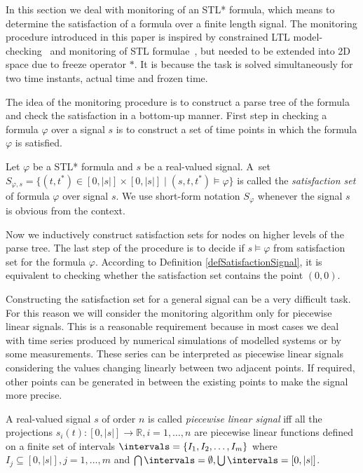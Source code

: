 \label{sec:algorithm}

In this section we deal with monitoring of an STL* formula, which means to determine the satisfaction of a formula over a finite length signal. 
The monitoring procedure introduced in this paper is inspired by constrained LTL model-checking~\cite{Calzone} and monitoring of STL formulae~\cite{Maler_STL}, but needed to be extended into 2D space due to freeze operator $\ast$. It is because the task is solved simultaneously for two time instants, actual time and frozen time.

The idea of the monitoring procedure is to construct a parse tree of the formula and check the satisfaction in a bottom-up manner. First step in checking a formula $\varphi$ over a signal $s$ is to construct a set of time points in which the formula $\varphi$ is satisfied.

\begin{definition}
	Let $\varphi$ be a STL* formula and $s$ be a real-valued signal. A~set $S_{\varphi,s} = \lbrace (t, t^\ast) \in [0, |s|] \times [0, |s|] \mid (s, t, t^\ast) \models \varphi \rbrace$ is called the \emph{satisfaction set} of formula $\varphi$ over signal $s$. We use short-form notation $S_\varphi$ whenever the signal $s$ is obvious from the context.
\end{definition}

Now we inductively construct satisfaction sets for nodes on higher levels of the parse tree. The last step of the procedure is to decide if $s \models \varphi$ from satisfaction set for the formula $\varphi$. According to Definition \ref{defSatisfactionSignal}, it is equivalent to checking whether the satisfaction set contains the point $(0, 0)$.

Constructing the satisfaction set for a general signal can be a very difficult task. For this reason we will consider the monitoring algorithm only for piecewise linear signals. This is a reasonable requirement because in most cases we deal with time series produced by numerical simulations of modelled systems or by some measurements. These series can be interpreted as piecewise linear signals considering the values changing linearly between two adjacent points. If required, other points can be generated in between the existing points to make the signal more precise. 


\begin{definition}
	A real-valued signal $s$ of order $n$ is called \emph{piecewise linear signal} iff all the projections $s_i(t) : [0, |s|] \rightarrow \mathbb{R}, i = 1, \ldots, n$ are piecewise linear functions defined on a finite set of intervals $\intervals = \lbrace I_1, I_2, \ldots, I_m \rbrace$ where $I_j \subseteq [0, |s|],j = 1,\ldots, m$ and $\bigcap\intervals= \emptyset, \bigcup\intervals= [0, |s|]$.
\end{definition}

